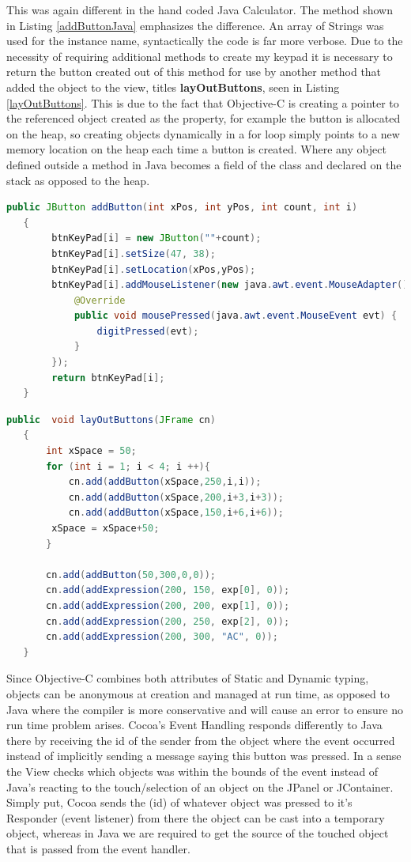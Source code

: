 \documentclass[a4paper,14pt]{article}
\begin{document}
This was again different in the hand coded Java Calculator. The method shown in Listing \ref{addButtonJava} emphasizes the difference. An array of Strings was used for the instance name, syntactically the code is far more verbose. Due to the necessity of requiring additional methods to create my keypad it is necessary to return the button created out of this method for use by another method that added the object to the view, titles \textbf{layOutButtons}, seen in Listing \ref{layOutButtons}.
This is due to the fact that Objective-C is creating a pointer to the referenced object created as the property, for example the button is allocated on the heap, so creating objects dynamically in a for loop simply points to a new memory location on the heap each time a button is created. Where any object defined outside a method in Java becomes a field of the class and declared on the stack as opposed to the heap.
\newpage
\begin{lstlisting}[caption={Create Button - Java},language=Java,label=addButtonJava,]
public JButton addButton(int xPos, int yPos, int count, int i)
   {
        btnKeyPad[i] = new JButton(""+count);
        btnKeyPad[i].setSize(47, 38);
        btnKeyPad[i].setLocation(xPos,yPos);
        btnKeyPad[i].addMouseListener(new java.awt.event.MouseAdapter() {
            @Override
            public void mousePressed(java.awt.event.MouseEvent evt) {
                digitPressed(evt);
            }
        });              
        return btnKeyPad[i];
   }
\end{lstlisting}
\begin{lstlisting}[caption={Lay Out Buttons - Java},language=Java,label=layOutButtons,]
public  void layOutButtons(JFrame cn)
   {
       int xSpace = 50;
       for (int i = 1; i < 4; i ++){
           cn.add(addButton(xSpace,250,i,i));
           cn.add(addButton(xSpace,200,i+3,i+3));
           cn.add(addButton(xSpace,150,i+6,i+6));
        xSpace = xSpace+50;
       }
       
       cn.add(addButton(50,300,0,0));
       cn.add(addExpression(200, 150, exp[0], 0));
       cn.add(addExpression(200, 200, exp[1], 0));
       cn.add(addExpression(200, 250, exp[2], 0));
       cn.add(addExpression(200, 300, "AC", 0));
   }
\end{lstlisting}
Since Objective-C combines both attributes of Static and Dynamic typing, objects can be anonymous at creation and managed at run time, as opposed to Java where the compiler is more conservative and will cause an error to ensure no run time problem arises. Cocoa's Event Handling responds differently to Java there by receiving the id of the sender from the object where the event occurred instead of implicitly sending a message saying this button was pressed. In a sense the View checks which objects was within the bounds of the event instead of Java's reacting to the touch/selection of an object on the JPanel or JContainer. Simply put, Cocoa sends the (id) of whatever object was pressed to it's Responder (event listener) from there the object can be cast into a temporary object, whereas in Java we are required to get the source of the touched object that is passed from the event handler.
\end{document}
